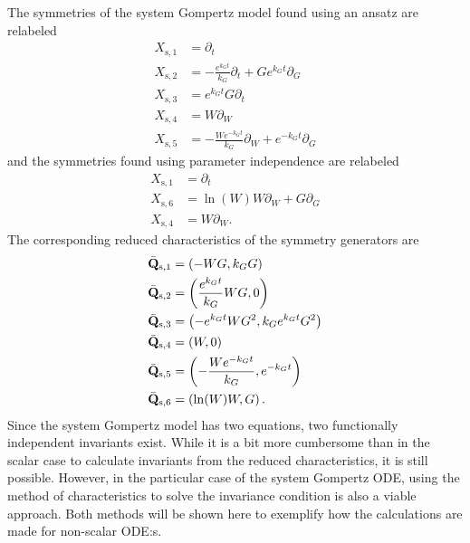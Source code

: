 The symmetries of the system Gompertz model found using an ansatz are relabeled
\begin{align}
  X_{\text{s},1} &= \partial_t \\
  X_{\text{s},2} &= - \frac{e^{k_{G} t}}{k_{G}} \partial_t + G e^{k_{G} t} \partial_G \\
  X_{\text{s},3} &= e^{k_{G} t} G \partial_t \\
  X_{\text{s},4} &= W \partial_W \\
  X_{\text{s},5} &= - \frac{W e^{- k_{G} t}}{k_{G}} \partial_W + e^{- k_{G} t} \partial_G
\end{align}
and the symmetries found using parameter independence are relabeled
\begin{align}
  X_{\text{s},1} &= \partial_t \\
  X_{\text{s},6} &= \ln(W) W \partial_W + G \partial_G \\
  X_{\text{s},4} &= W \partial_W.
\end{align}
The corresponding reduced characteristics of the symmetry generators are
\begin{align}
  \bar{\vb{Q}}_{\text{s},1} &= \left(-W G, k_G G\right) \\
  \bar{\vb{Q}}_{\text{s},2} &= \left(\frac{e^{k_{G} t}}{k_{G}} W G, 0\right) \\
  \bar{\vb{Q}}_{\text{s},3} &= \left(- e^{k_{G} t} W G^2, k_G e^{k_{G} t} G^2\right) \\
  \bar{\vb{Q}}_{\text{s},4} &= \left(W, 0\right) \\
  \bar{\vb{Q}}_{\text{s},5} &= \left(- \frac{W e^{- k_{G} t}}{k_{G}}, e^{- k_{G} t} \right) \\
  \bar{\vb{Q}}_{\text{s},6} &= \left(\ln(W) W, G\right).
\end{align}
Since the system Gompertz model has two equations, two functionally independent invariants exist.
While it is a bit more cumbersome than in the scalar case to calculate invariants from the reduced characteristics, it is still possible.
However, in the particular case of the system Gompertz ODE, using the method of characteristics to solve the invariance condition is also a viable approach.
Both methods will be shown here to exemplify how the calculations are made for non-scalar ODE:s.


